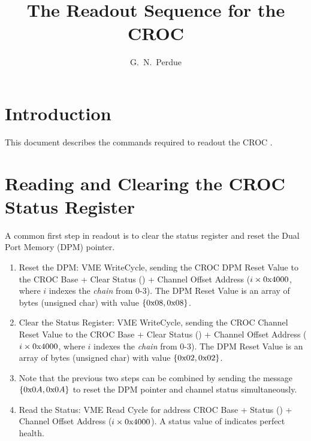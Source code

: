 




\linenumbers

\title{The Readout Sequence for the \minerva CROC}

\author[1]{G.~N.~Perdue}
\affil[1]{\Rochester}

\maketitle


\section{Introduction}
\label{sec:introduction}

This document describes the commands required to readout the \minerva CROC \cite{refcroc}.

\section{Reading and Clearing the CROC Status Register}
\label{sec:readandclearcrocstatus}

A common first step in readout is to clear the status register and reset the Dual Port Memory (DPM) pointer.

\begin{enumerate}
\item Reset the DPM: VME WriteCycle, sending the CROC DPM Reset Value to the CROC Base + Clear Status () + Channel Offset Address ($i \times 0\text{x}4000$, where $i$ indexes the \emph{chain} from 0-3). The DPM Reset Value is an array of bytes (unsigned char) with value $\left\{0\text{x}08,0\text{x}08\right\}$. 
\item Clear the Status Register: VME WriteCycle, sending the CROC Channel Reset Value to the CROC Base + Clear Status () + Channel Offset Address ($i \times 0\text{x}4000$, where $i$ indexes the \emph{chain} from 0-3). The DPM Reset Value is an array of bytes (unsigned char) with value $\left\{0\text{x}02,0\text{x}02\right\}$. 
\item Note that the previous two steps can be combined by sending the message $\left\{0\text{x}0A,0\text{x}0A\right\}$ to reset the DPM pointer and channel status simultaneously.
\item Read the Status: VME Read Cycle for address CROC Base + Status () + Channel Offset Address ($i \times 0\text{x}4000$). A status value of  indicates perfect health.
\end{enumerate}


